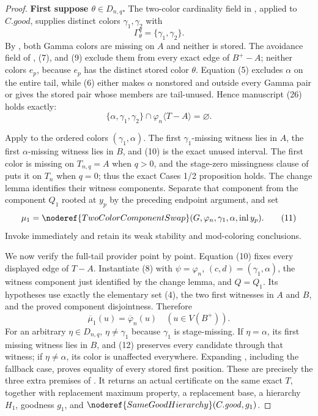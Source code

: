 \begin{proof}
\textbf{First suppose \(\theta\in D_{n,q}\).}
The two-color cardinality field in , applied to
\(C.\mathit{good}\), supplies distinct colors \(\gamma_1,\gamma_2\) with
\[
                 \Gamma^q_\theta=\{\gamma_1,\gamma_2\}.       \tag{9}
\]
By , both Gamma colors are missing
on \(A\) and neither is stored.  The avoidance field of
, (7), and (9)
exclude them from every exact edge of \(B^+-A\); neither colors \(e_p\),
because \(e_p\) has the distinct stored color \(\theta\).  Equation (5)
excludes \(\alpha\) on the entire tail, while (6) either makes \(\alpha\)
nonstored and outside every Gamma pair or gives the stored pair whose
members are tail-unused.  Hence manuscript (26) holds exactly:
\[
 \{\alpha,\gamma_1,\gamma_2\}\cap
       \varphi_n\langle T-A\rangle=\varnothing.               \tag{10}
\]

Apply  to the ordered colors
\((\gamma_1,\alpha)\).  The first \(\gamma_1\)-missing witness lies in
\(A\), the first \(\alpha\)-missing witness lies in \(B\), and (10)
is the exact unused interval.  The first color is missing on
\(T_{n,q}=A\) when \(q>0\), and the stage-zero missingness clause of
 puts it on \(T_n\) when \(q=0\); thus the exact
Cases 1/2 proposition holds.  The change lemma identifies their witness
components.  Separate that component from the component \(Q_1\) rooted
at \(y_p\) by the preceding endpoint argument, and set
\[
 \mu_1=\noderef{TwoColorComponentSwap}
       (G,\varphi_n,\gamma_1,\alpha,\operatorname{inl}y_p).    \tag{11}
\]
Invoke  immediately and retain its weak
stability and mod-coloring conclusions.

We now verify the full-tail provider point by point.  Equation (10) fixes
every displayed edge of \(T-A\).  Instantiate (8) with
\(\psi=\varphi_n\), \((c,d)=(\gamma_1,\alpha)\), the witness component
just identified by the change lemma, and \(Q=Q_1\).  Its hypotheses use
exactly the elementary set (4), the two first witnesses in \(A\) and
\(B\), and the proved component disjointness.  Therefore
\[
 \overline\mu_1(u)=\overline\varphi_n(u)
                           \quad(u\in V(B^+)).                 \tag{12}
\]
For an arbitrary \(\eta\in D_{n,q}\), \(\eta\ne\gamma_1\) because
\(\gamma_1\) is stage-missing.  If \(\eta=\alpha\), its first missing
witness lies in \(B\), and (12) preserves every candidate through that
witness; if \(\eta\ne\alpha\), its color is unaffected everywhere.
Expanding , including the fallback
case, proves equality of every stored first position.  These are precisely
the three extra premises of
.  It returns an actual
 certificate on the same exact
\(T\), together with replacement maximum property, a replacement base,
a hierarchy \(H_1\), goodness \(g_1\), and
\(\noderef{SameGoodHierarchy}(C.\mathit{good},g_1)\).


\end{proof}
